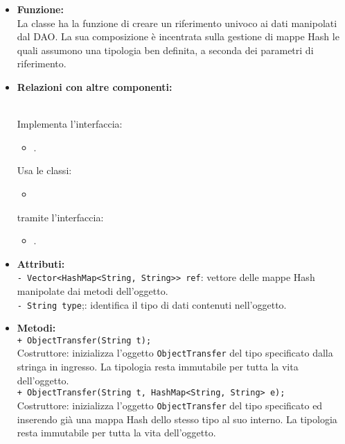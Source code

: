 {\begin{sloppypar}
{{{{\begin{itemize}
				\item[] \textbf{Funzione:}{\\
				La classe ha la funzione di creare un riferimento univoco ai dati manipolati dal DAO.
				La sua composizione è incentrata sulla gestione di mappe Hash le quali assumono una tipologia ben  definita, a seconda dei parametri di riferimento.\\
				 }
			
			\item[] \textbf{Relazioni con altre componenti:}{\\			
				Implementa l’interfaccia: 
					\begin{itemize}
						\item[] .
					\end{itemize}
				Usa le classi:
					\begin{itemize}
				 		\item[] 
				 	\end{itemize}
				tramite l'interfaccia:
				 	\begin{itemize}
						\item[].\\
					\end{itemize}
				}
				
				\item[] \textbf{Attributi:}{\\
					\texttt{- Vector<HashMap<String, String>> ref}: vettore delle mappe Hash manipolate dai metodi dell'oggetto.\\
					
					\texttt{- String type};: identifica il tipo di dati contenuti nell'oggetto.\\
				}
				
				\item[] \textbf{Metodi:}{\\
				\texttt{+ ObjectTransfer(String t);}\\
				Costruttore: inizializza l'oggetto \texttt{ObjectTransfer} del tipo specificato dalla stringa in ingresso. La tipologia resta immutabile per tutta la vita dell'oggetto.\\
				
				\texttt{+ ObjectTransfer(String t, HashMap<String, String> e);}\\
				Costruttore: inizializza l'oggetto \texttt{ObjectTransfer} del tipo specificato ed inserendo già una mappa Hash dello stesso tipo al suo interno. La tipologia resta immutabile per tutta la vita dell'oggetto.\\
				
}
\end{itemize}}}}}
\end{sloppypar}}
